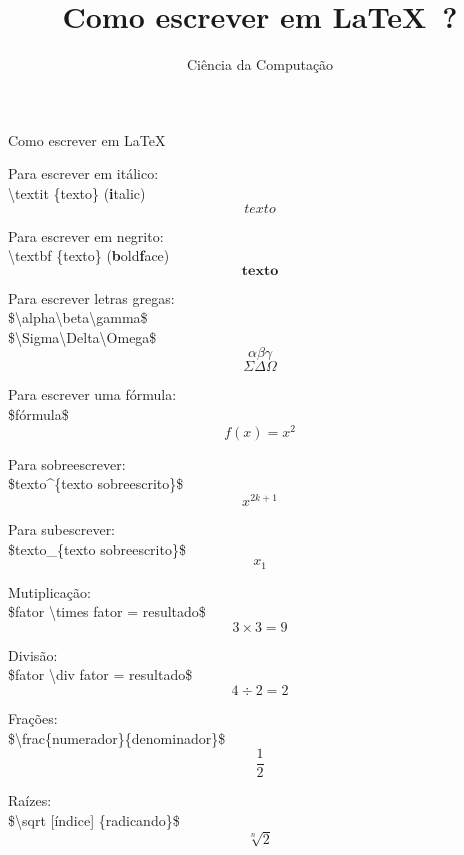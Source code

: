 \documentclass[a4paper,12pt]{article}
\title{Como escrever em \LaTeX\ ?}
\author{Ciência da Computação}
\date{}
\begin{document}
\maketitle

Como escrever em \LaTeX\ 

Para escrever em itálico:\\
\textbackslash textit \{texto\} (\textbf{i}talic)
\[\textit {texto}\]

Para escrever em negrito:\\
\textbackslash textbf  \{texto\} (\textbf{b}old\textbf{f}ace)
\[\textbf {texto}\]

Para escrever letras gregas: \\
\$\textbackslash alpha\textbackslash beta\textbackslash gamma\$ \\
\$\textbackslash Sigma\textbackslash Delta\textbackslash Omega\$\\

\[\alpha \beta \gamma\] 
\[\Sigma \Delta \Omega\]

Para escrever uma fórmula: \\
\$fórmula\$
\[f(x)= x^2\]

Para sobreescrever: \\
\$texto\^{}\{texto sobreescrito\}\$
\[x^{2k+1}\]

Para subescrever: \\
\$texto\_\{texto sobreescrito\}\$ 
\[x_1\]

Mutiplicação: \\
\$fator \textbackslash times fator = resultado\$ 
\[3 \times 3 = 9\]

Divisão: \\
\$fator \textbackslash div fator = resultado\$ 
 \[4 \div 2 = 2\]

Frações: \\
\$\textbackslash frac\{numerador\}\{denominador\}\$
\[\frac{1}{2}\]

Raízes: \\
\$\textbackslash sqrt [índice] \{radicando\}\$
\[\sqrt [n] {2}\]
\end{document}
